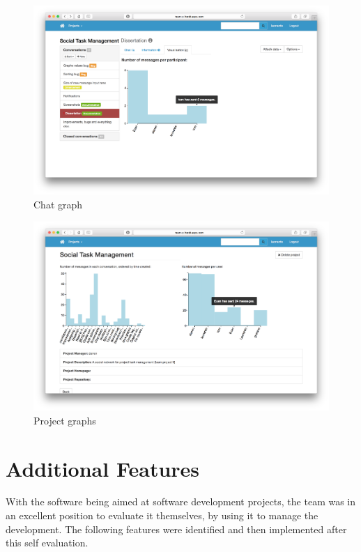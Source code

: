 \documentclass[a4paper]{l3proj}
\begin{document}
\begin{figure}
\centering
\includegraphics[scale=0.3]{graphs1}
\caption{Chat graph}
\label{figure:graphs1}
\end{figure}

\begin{figure}
\centering
\includegraphics[scale=0.3]{graphs2}
\caption{Project graphs}
\label{figure:graphs2}
\end{figure}


\section{Additional Features}
\label{dog}
With the software being aimed at software development projects, the team was in an excellent position to evaluate it themselves, by using it to manage the development. The following features were identified and then implemented after this self evaluation.
\end{document}
